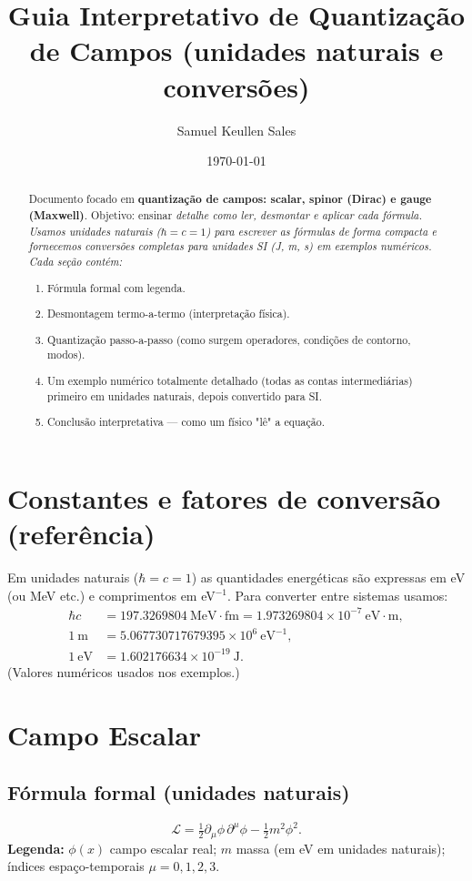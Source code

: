 \documentclass[12pt,a4paper]{article}
\title{Guia Interpretativo de Quantização de Campos (unidades naturais e conversões)}
\author{Samuel Keullen Sales}
\date{\today}
\begin{document}
\maketitle

\begin{abstract}
Documento focado em \textbf{quantização de campos: scalar, spinor (Dirac) e gauge (Maxwell)}. Objetivo: ensinar \em detalhe como \emph{ler}, \emph{desmontar} e \emph{aplicar} cada fórmula. Usamos unidades naturais ($\hbar=c=1$) para escrever as fórmulas de forma compacta e fornecemos conversões completas para unidades SI (J, m, s) em exemplos numéricos. Cada seção contém:
\begin{enumerate}
  \item Fórmula formal com legenda.
  \item Desmontagem termo-a-termo (interpretação física).
  \item Quantização passo-a-passo (como surgem operadores, condições de contorno, modos).
  \item Um exemplo numérico totalmente detalhado (todas as contas intermediárias) primeiro em unidades naturais, depois convertido para SI.
  \item Conclusão interpretativa — como um físico "lê" a equação.
\end{enumerate}
\end{abstract}

\section*{Constantes e fatores de conversão (referência)}
Em unidades naturais ($\hbar=c=1$) as quantidades energéticas são expressas em eV (ou MeV etc.) e comprimentos em eV$^{-1}$. Para converter entre sistemas usamos:
\begin{align}
\hbar c &= 197.3269804\ \mathrm{MeV\cdot fm} = 1.973269804\times10^{-7}\ \mathrm{eV\cdot m}, \\
1\ \mathrm{m} &= 5.067730717679395\times10^{6}\ \mathrm{eV^{-1}}, \\
1\ \mathrm{eV} &= 1.602176634\times10^{-19}\ \mathrm{J}.
\end{align}
(Valores numéricos usados nos exemplos.)

\section{Campo Escalar}
\subsection{Fórmula formal (unidades naturais)}
\begin{equation}\label{lag_scalar}
\mathcal{L} = \tfrac{1}{2}\partial_\mu\phi\,\partial^\mu\phi - \tfrac{1}{2} m^2 \phi^2.
\end{equation}
\textbf{Legenda:} $\phi(x)$ campo escalar real; $m$ massa (em eV em unidades naturais); índices espaço-temporais $\mu=0,1,2,3$.
\end{document}
